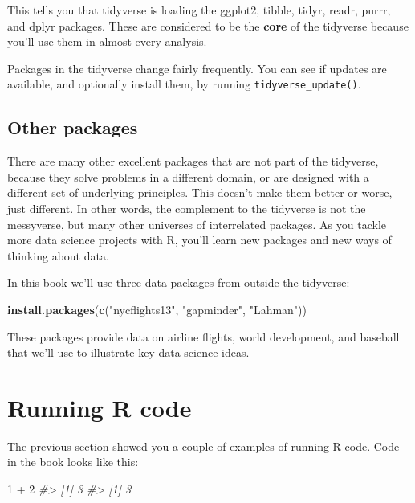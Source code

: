 \documentclass[]{book}
\newenvironment{Shaded}{\begin{snugshade}}{\end{snugshade}}
\newcommand{\KeywordTok}[1]{\textcolor[rgb]{0.13,0.29,0.53}{\textbf{{#1}}}}
\newcommand{\DecValTok}[1]{\textcolor[rgb]{0.00,0.00,0.81}{{#1}}}
\newcommand{\StringTok}[1]{\textcolor[rgb]{0.31,0.60,0.02}{{#1}}}
\newcommand{\CommentTok}[1]{\textcolor[rgb]{0.56,0.35,0.01}{\textit{{#1}}}}
\newcommand{\NormalTok}[1]{{#1}}
\begin{document}
This tells you that tidyverse is loading the ggplot2, tibble, tidyr,
readr, purrr, and dplyr packages. These are considered to be the
\textbf{core} of the tidyverse because you'll use them in almost every
analysis.

Packages in the tidyverse change fairly frequently. You can see if
updates are available, and optionally install them, by running
\texttt{tidyverse\_update()}.

\subsection{Other packages}\label{other-packages}

There are many other excellent packages that are not part of the
tidyverse, because they solve problems in a different domain, or are
designed with a different set of underlying principles. This doesn't
make them better or worse, just different. In other words, the
complement to the tidyverse is not the messyverse, but many other
universes of interrelated packages. As you tackle more data science
projects with R, you'll learn new packages and new ways of thinking
about data.

In this book we'll use three data packages from outside the tidyverse:

\begin{Shaded}
\begin{Highlighting}[]
\KeywordTok{install.packages}\NormalTok{(}\KeywordTok{c}\NormalTok{(}\StringTok{"nycflights13"}\NormalTok{, }\StringTok{"gapminder"}\NormalTok{, }\StringTok{"Lahman"}\NormalTok{))}
\end{Highlighting}
\end{Shaded}

These packages provide data on airline flights, world development, and
baseball that we'll use to illustrate key data science ideas.

\section{Running R code}\label{running-r-code}

The previous section showed you a couple of examples of running R code.
Code in the book looks like this:

\begin{Shaded}
\begin{Highlighting}[]
\DecValTok{1} \NormalTok{+}\StringTok{ }\DecValTok{2}
\CommentTok{#> [1] 3}
\CommentTok{#> [1] 3}
\end{Highlighting}
\end{Shaded}
\end{document}
